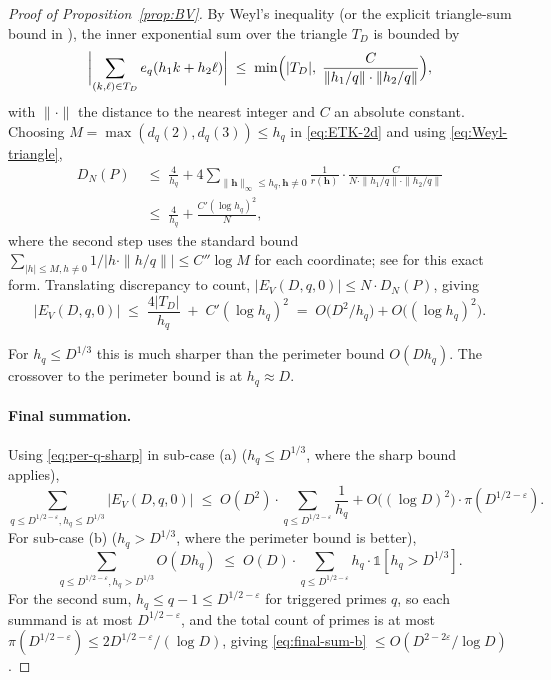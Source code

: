 \begin{proof}[Proof of Proposition~\ref{prop:BV}]
By Weyl's inequality (or the explicit triangle-sum bound in
\cite[Thm.~1.5]{DrmotaTichy1997}), the inner exponential sum over the
triangle $T_{D}$ is bounded by
\begin{equation}\label{eq:Weyl-triangle}
  \biggl| \sum_{(k, \ell) \in T_{D}} e_{q}(h_{1} k + h_{2} \ell) \biggr|
  \;\leq\; \min\Bigl( |T_{D}|,\; \frac{C}{\|h_{1}/q\| \cdot \|h_{2}/q\|}
       \Bigr),
\end{equation}
with $\|\cdot\|$ the distance to the nearest integer and $C$ an absolute
constant. Choosing $M = \max(d_{q}(2), d_{q}(3)) \leq h_{q}$ in
\eqref{eq:ETK-2d} and using \eqref{eq:Weyl-triangle},
\begin{align}
  D_{N}(P) \;&\leq\; \frac{4}{h_{q}} + 4
    \sum_{\|\mathbf{h}\|_{\infty} \leq h_{q}, \mathbf{h} \neq 0}
       \frac{1}{r(\mathbf{h})} \cdot
       \frac{C}{N \cdot \|h_{1}/q\| \cdot \|h_{2}/q\|} \\
  \;&\leq\; \frac{4}{h_{q}} + \frac{C' (\log h_{q})^{2}}{N},
\end{align}
where the second step uses the standard bound
$\sum_{|h| \leq M, h \neq 0} 1/|h \cdot \|h/q\|| \leq C'' \log M$ for
each coordinate; see \cite[Lemma~3.1]{DrmotaTichy1997} for this exact
form. Translating discrepancy to count, $|E_{V}(D, q, 0)| \leq N \cdot
D_{N}(P)$, giving
\begin{equation}\label{eq:per-q-sharp}
  |E_{V}(D, q, 0)| \;\leq\; \frac{4 |T_{D}|}{h_{q}}
    \;+\; C' (\log h_{q})^{2}
  \;=\; O\bigl( D^{2} / h_{q} \bigr) + O\bigl( (\log h_{q})^{2} \bigr).
\end{equation}

For $h_{q} \leq D^{1/3}$ this is much sharper than the perimeter bound
$O(D h_{q})$. The crossover to the perimeter bound is at $h_{q}
\approx D$.

\paragraph{Final summation.} Using \eqref{eq:per-q-sharp} in sub-case
(a) ($h_{q} \leq D^{1/3}$, where the sharp bound applies),
\begin{equation}\label{eq:final-sum-a}
  \sum_{q \leq D^{1/2 - \varepsilon}, h_{q} \leq D^{1/3}}
    |E_{V}(D, q, 0)|
  \;\leq\; O(D^{2}) \cdot \sum_{q \leq D^{1/2-\varepsilon}} \frac{1}{h_{q}}
    + O\bigl( (\log D)^{2} \bigr) \cdot \pi(D^{1/2-\varepsilon}).
\end{equation}
For sub-case (b) ($h_{q} > D^{1/3}$, where the perimeter bound is
better),
\begin{equation}\label{eq:final-sum-b}
  \sum_{q \leq D^{1/2 - \varepsilon}, h_{q} > D^{1/3}}
    O(D h_{q})
  \;\leq\; O(D) \cdot \sum_{q \leq D^{1/2-\varepsilon}}
       h_{q} \cdot \mathbb{1}[h_{q} > D^{1/3}].
\end{equation}
For the second sum, $h_{q} \leq q - 1 \leq D^{1/2-\varepsilon}$ for
triggered primes $q$, so each summand is at most $D^{1/2-\varepsilon}$,
and the total count of primes is at most $\pi(D^{1/2-\varepsilon}) \leq
2 D^{1/2-\varepsilon} / (\log D)$, giving \eqref{eq:final-sum-b} $\leq
O(D^{2 - 2\varepsilon} / \log D)$.


\end{proof}
